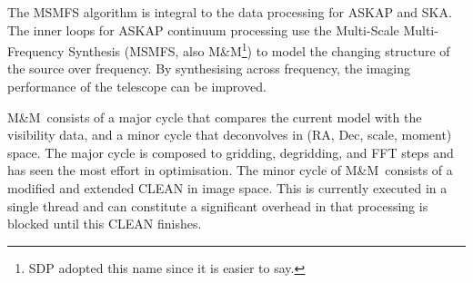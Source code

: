 \documentclass[11pt,a4paper,variablewidth]{article}
\begin{document}

\newcommand{\Wim}{{{\W^{\rm im}}}}
\newcommand{\Wimd}{{{{\W^{\rm im}}^\dag}}}
\newcommand{\Wnt}{{{\W^{\rm {mfs}}_t}}}
\newcommand{\Wntd}{{{{\W^{\rm {mfs}}_t}^\dag}}}
\newcommand{\Wnp}{{{\W^{\rm mfs}_p}}}
\newcommand{\Wnpd}{{{{\W^{\rm mfs}_p}^\dag}}}
\newcommand{\Wnq}{{{\W^{\rm mfs}_q}}}
\newcommand{\Wnqd}{{{{\W^{\rm {mfs}}_q}^\dag}}}
\newcommand{\Wimn}{{{\W^{\rm im}_{\nu}}}}
\newcommand{\Wimnd}{{{{\W^{\rm im}_{\nu}}^\dag}}}

\newcommand{\wnt}{{w_{\nu}^t}}
\newcommand{\wnq}{{w_{\nu}^q}}
\newcommand{\wntq}{{w_{\nu}^{t+q}}}

\newcommand{\pd}{{\partial}}
\newcommand{\mi}{{m_{I}}}
\newcommand{\R}{{R}}
\newcommand{\Rd}{{R^\dag}}
\newcommand{\I}{{\vec{I}}}

\newcommand{\Nt}{N_{\rm Taylor}}
\newcommand{\Ns}{N_{\rm scales}}
\newcommand{\Nc}{N_{\rm chan}}
\newcommand{\Np}{N_{\rm pix}}
\newcommand{\Nf}{N_{\rm Facet}}

\newcommand{\MAM}{M\&M}

\newcommand{\ARL}{ARL}


\sdplistoffigures

\sdplistoftables

\sdpsummary

The MSMFS algorithm is integral to the data processing for ASKAP and SKA. The inner loops for ASKAP continuum processing use the Multi-Scale Multi-Frequency Synthesis (MSMFS, also \MAM\footnote{SDP adopted this name since it is easier to say.}) to model the changing structure of the source over frequency. By synthesising across frequency, the imaging performance of the telescope can be improved.

\MAM\ consists of a major cycle that compares the current model with the visibility data, and a minor cycle that deconvolves in (RA, Dec, scale, moment) space. The major cycle is composed to gridding, degridding, and FFT steps and has seen the most effort in optimisation. The minor cycle of \MAM\ consists of a modified and extended CLEAN in image space. This is currently executed in a single thread and can constitute a significant overhead in that processing is blocked until this CLEAN finishes.
\end{document}
